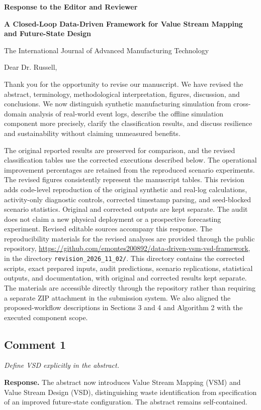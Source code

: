\documentclass[11pt,a4paper]{article}
\newcommand{\commentitem}[2]{\Needspace{9\baselineskip}\subsection*{Comment #1}\textit{#2}\par\textbf{Response.} }
\begin{document}
\begin{center}
{\Large\bfseries Response to the Editor and Reviewer}\par\medskip
\textbf{A Closed-Loop Data-Driven Framework for Value Stream Mapping and Future-State Design}\par\smallskip
The International Journal of Advanced Manufacturing Technology
\end{center}
Dear Dr. Russell,

Thank you for the opportunity to revise our manuscript. We have revised the abstract, terminology, methodological interpretation, figures, discussion, and conclusions. We now distinguish synthetic manufacturing simulation from cross-domain analysis of real-world event logs, describe the offline simulation component more precisely, clarify the classification results, and discuss resilience and sustainability without claiming unmeasured benefits.

The original reported results are preserved for comparison, and the revised classification tables use the corrected executions described below. The operational improvement percentages are retained from the reproduced scenario experiments. The revised figures consistently represent the manuscript tables. This revision adds code-level reproduction of the original synthetic and real-log calculations, activity-only diagnostic controls, corrected timestamp parsing, and seed-blocked scenario statistics. Original and corrected outputs are kept separate. The audit does not claim a new physical deployment or a prospective forecasting experiment. Revised editable sources accompany this response. The reproducibility materials for the revised analyses are provided through the public repository, \url{https://github.com/emontes200892/data-driven-vsm-vsd-framework}, in the directory \texttt{revision\_2026\_11\_02/}. This directory contains the corrected scripts, exact prepared inputs, audit predictions, scenario replications, statistical outputs, and documentation, with original and corrected results kept separate. The materials are accessible directly through the repository rather than requiring a separate ZIP attachment in the submission system. We also aligned the proposed-workflow descriptions in Sections 3 and 4 and Algorithm 2 with the executed component scope.

\commentitem{1}{Define VSD explicitly in the abstract.}
The abstract now introduces Value Stream Mapping (VSM) and Value Stream Design (VSD), distinguishing waste identification from specification of an improved future-state configuration. The abstract remains self-contained.
\end{document}
